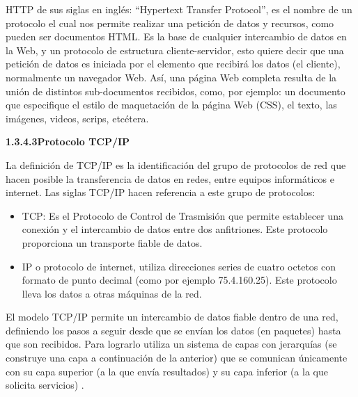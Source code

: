     HTTP de sus siglas en inglés: “Hypertext Transfer Protocol”, es el nombre de un protocolo el cual nos permite realizar una petición de datos y recursos, como pueden ser documentos HTML. Es la base de cualquier intercambio de datos en la Web, y un protocolo de estructura cliente-servidor, esto quiere decir que una petición de datos es iniciada por el elemento que recibirá los datos (el cliente), normalmente un navegador Web. Así, una página Web completa resulta de la unión de distintos sub-documentos recibidos, como, por ejemplo: un documento que especifique el estilo de maquetación de la página Web (CSS), el texto, las imágenes, videos, scrips, etcétera.

        \textbf{1.3.4.3\hspace{5mm}Protocolo TCP/IP}

    La definición de TCP/IP es la identificación del grupo de protocolos de red que hacen posible la transferencia de datos en redes, entre equipos informáticos e internet. Las siglas TCP/IP hacen referencia a este grupo de protocolos:

    \begin{itemize}
        \item TCP: Es el Protocolo de Control de Trasmisión que permite establecer una conexión y el intercambio de datos entre dos anfitriones. Este protocolo proporciona un transporte fiable de datos.
        \item IP o protocolo de internet, utiliza direcciones series de cuatro octetos con formato de punto decimal (como por ejemplo 75.4.160.25). Este protocolo lleva los datos a otras máquinas de la red.
    \end{itemize}

    El modelo TCP/IP permite un intercambio de datos fiable dentro de una red, definiendo los pasos a seguir desde que se envían los datos (en paquetes) hasta que son recibidos. Para lograrlo utiliza un sistema de capas con jerarquías (se construye una capa a continuación de la anterior) que se comunican únicamente con su capa superior (a la que envía resultados) y su capa inferior (a la que solicita servicios) \cite{tcp/ip}.


